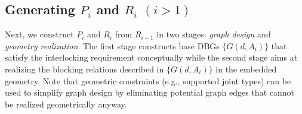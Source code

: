 
\vspace*{-0.8mm}
\subsection{Generating $P_i$ and $R_i$ $(i>1)$} 
\label{subsec:genPart}
Next, we construct $P_i$ and $R_i$ from $R_{i-1}$ in two stages: {\em graph design} and {\em geometry realization}.
The first stage constructs base DBGs $\{G(d, A_i)\}$ that satisfy the interlocking requirement conceptually while the second stage aims at realizing the blocking relations described in $\{G(d, A_i)\}$ in the embedded geometry.
Note that geometric constraints (e.g., supported joint types) can be used to simplify graph design by eliminating  potential graph edges that cannot be realized geometrically anyway.



